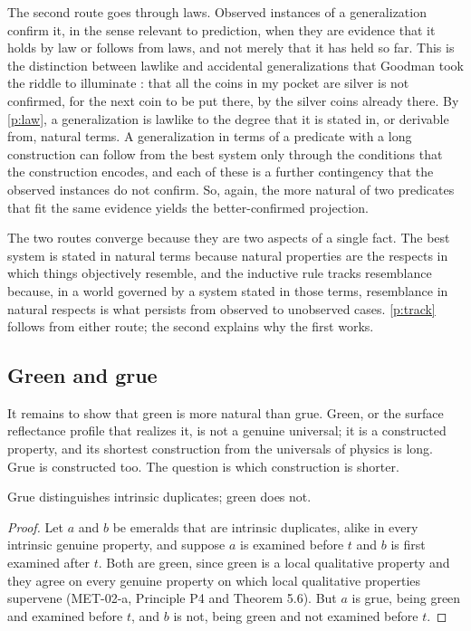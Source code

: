 \documentclass{situationist-preprint}
\begin{document}
The second route goes through laws. Observed instances of a generalization confirm it, in the sense relevant to prediction, when they are evidence that it holds by law or follows from laws, and not merely that it has held so far. This is the distinction between lawlike and accidental generalizations that Goodman took the riddle to illuminate \citep[ch.~III]{Goodman1955}: that all the coins in my pocket are silver is not confirmed, for the next coin to be put there, by the silver coins already there. By \ref{p:law}, a generalization is lawlike to the degree that it is stated in, or derivable from, natural terms. A generalization in terms of a predicate with a long construction can follow from the best system only through the conditions that the construction encodes, and each of these is a further contingency that the observed instances do not confirm. So, again, the more natural of two predicates that fit the same evidence yields the better-confirmed projection.

The two routes converge because they are two aspects of a single fact. The best system is stated in natural terms because natural properties are the respects in which things objectively resemble, and the inductive rule tracks resemblance because, in a world governed by a system stated in those terms, resemblance in natural respects is what persists from observed to unobserved cases. \ref{p:track} follows from either route; the second explains why the first works.

\subsection{Green and grue}

It remains to show that green is more natural than grue. Green, or the surface reflectance profile that realizes it, is not a genuine universal; it is a constructed property, and its shortest construction from the universals of physics is long. Grue is constructed too. The question is which construction is shorter.

\begin{proposition}\label{p:dup}
Grue distinguishes intrinsic duplicates; green does not.
\end{proposition}

\begin{proof}
Let $a$ and $b$ be emeralds that are intrinsic duplicates, alike in every intrinsic genuine property, and suppose $a$ is examined before $t$ and $b$ is first examined after $t$. Both are green, since green is a local qualitative property and they agree on every genuine property on which local qualitative properties supervene (MET-02-a, Principle P4 and Theorem 5.6). But $a$ is grue, being green and examined before $t$, and $b$ is not, being green and not examined before $t$.
\end{proof}
\end{document}
